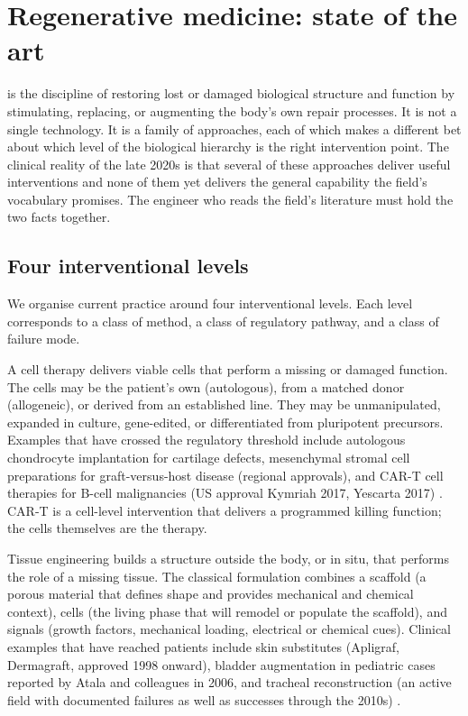 \section{Regenerative medicine: state of the art}

 is the discipline of restoring lost or
damaged biological structure and function by stimulating, replacing, or
augmenting the body's own repair processes. It is not a single
technology. It is a family of approaches, each of which makes a
different bet about which level of the biological hierarchy is the
right intervention point. The clinical reality of the late 2020s is
that several of these approaches deliver useful interventions and none
of them yet delivers the general capability the field's vocabulary
promises. The engineer who reads the field's literature must hold the
two facts together.

\subsection{Four interventional levels}

We organise current practice around four interventional levels. Each
level corresponds to a class of method, a class of regulatory pathway,
and a class of failure mode.

 A cell therapy delivers viable cells
that perform a missing or damaged function. The cells may be the
patient's own (autologous), from a matched donor (allogeneic), or
derived from an established line. They may be unmanipulated, expanded
in culture, gene-edited, or differentiated from pluripotent precursors.
Examples that have crossed the regulatory threshold include autologous
chondrocyte implantation for cartilage defects, mesenchymal stromal
cell preparations for graft-versus-host disease (regional approvals),
and CAR-T cell therapies for B-cell malignancies (US approval Kymriah
2017, Yescarta 2017) \cite{paper:v6c13-june-cart-2018,
text:v6c13-atala-principles-regen}. CAR-T is a cell-level intervention
that delivers a programmed killing function; the cells themselves are
the therapy.

 Tissue engineering builds a
structure outside the body, or in situ, that performs the role of a
missing tissue. The classical formulation combines a scaffold (a porous
material that defines shape and provides mechanical and chemical
context), cells (the living phase that will remodel or populate the
scaffold), and signals (growth factors, mechanical loading, electrical
or chemical cues). Clinical examples that have reached patients include
skin substitutes (Apligraf, Dermagraft, approved 1998 onward), bladder
augmentation in pediatric cases reported by Atala and colleagues in
2006, and tracheal reconstruction (an active field with documented
failures as well as successes through the 2010s)
\cite{paper:v6c13-atala-bladder-2006, text:v6c13-atala-principles-regen}.

